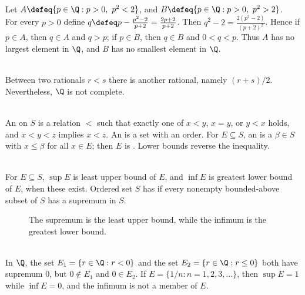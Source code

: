 \begin{example} \label{ex:rational-cut-around-square-root-two} \\
Let $A\defeq\{p\in\Q:p>0,\ p^2<2\}$, and $B\defeq\{p\in\Q:p>0,\ p^2>2\}$.\\
For every $p>0$ define $q\defeq p-\frac{p^2-2}{p+2}=\frac{2p+2}{p+2}$. Then $q^2-2=\frac{2(p^2-2)}{(p+2)^2}$.
Hence if $p\in A$, then $q\in A$ and $q>p$; if $p\in B$, then $q\in B$ and $0<q<p$. Thus $A$ has no largest element in $\Q$, and $B$ has no smallest element in $\Q$.
\end{example}

\begin{remark} \label{rem:rational-density-does-not-fill-gaps} \\
Between two rationals $r<s$ there is another rational, namely $(r+s)/2$. Nevertheless, $\Q$ is not complete.
\end{remark}

\begin{definition} \label{def:ordered-set-and-bounds} \\
An  on $S$ is a relation $<$ such that exactly one of $x<y$, $x=y$, or $y<x$ holds, and $x<y<z$ implies $x<z$. An  is a set with an order. For $E\subseteq S$, an  is a $\beta\in S$ with $x\leq\beta$ for all $x\in E$; then $E$ is . Lower bounds reverse the inequality.
\end{definition}

\begin{definition} \label{def:supremum-infimum-lub-property} \\
For $E\subseteq S$, $\sup E$ is least upper bound of $E$, and $\inf E$ is greatest lower bound of $E$, when these exist. Ordered set $S$ has  if every nonempty bounded-above subset of $S$ has a supremum in $S$.
\end{definition}

\begin{figure}[H]
  \centering
  
  \caption{The supremum is the least upper bound, while the infimum is the greatest lower bound.}
  \label{fig:supremum-infimum-bounds}
\end{figure}

\begin{example} \label{ex:supremum-need-not-be-attained} \\
In $\Q$, the set $E_1=\{r\in\Q:r<0\}$ and the set $E_2=\{r\in\Q:r\leq0\}$ both have supremum $0$, but $0\notin E_1$ and $0\in E_2$. If $E=\{1/n:n=1,2,3,\ldots\}$, then $\sup E=1$ while $\inf E=0$, and the infimum is not a member of $E$.
\end{example}


